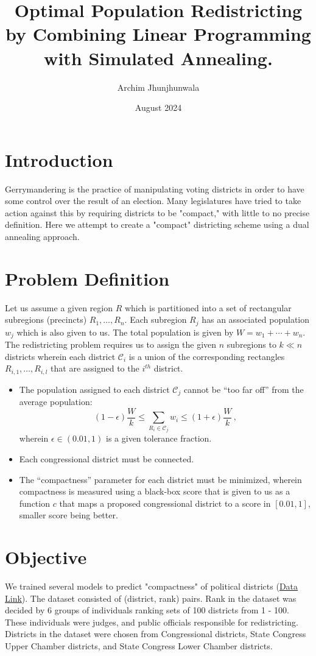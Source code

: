 \documentclass{article}
\title{Optimal Population Redistricting by Combining Linear Programming with Simulated Annealing.}
\author{Archim Jhunjhunwala}
\date{August 2024}
\begin{document}
\newcommand\scr[1]{\mathcal{#1}}

\maketitle

\section{Introduction}
Gerrymandering is the practice of manipulating voting districts in order to
have some control over the result of an election. Many legislatures have tried
to take action against this by requiring districts to be "compact," with little
to no precise definition. Here we attempt to create a "compact" districting
scheme using a dual annealing approach.

\section{Problem Definition}

Let us assume a given region $R$ which is partitioned into a set of rectangular
subregions (precincts) $R_1, \ldots, R_n$. Each subregion $R_j$ has an
associated population $w_j$ which is also given to us. The total population is
given by $W = w_1 + \cdots + w_n$. The redistricting problem requires us to
assign the given $n$ subregions to $k \ll n$ districts wherein each district
$\scr{C}_i$ is a union of the corresponding rectangles $R_{i,1}, \ldots,
	R_{i,l}$ that are assigned to the $i^{th}$ district.
\begin{itemize}
	\item The population assigned to each district $\scr{C}_j$ cannot be ``too far off''
	      from the average population:
	      \[  (1 - \epsilon) \frac{W}{k} \leq \sum_{R_i \in \scr{C}_j} w_i \leq (1 + \epsilon) \frac{W}{k}  \,,\]
	      wherein $\epsilon \in (0.01, 1)$ is a given tolerance fraction.
	\item Each congressional district must be connected.
	\item The ``compactness'' parameter for each district must be minimized, wherein
	      compactness is measured using a black-box score that is given to us as a
	      function $c$ that maps a proposed congressional district to a score in $[0.01,
				      1]$, smaller score being better.
\end{itemize}

\section{Objective}
We trained several models to predict "compactness" of political districts
(\href{https://github.com/aaronrkaufman/compactness}{Data Link}). The dataset
consisted of (district, rank) pairs. Rank in the dataset was decided by 6
groups of individuals ranking sets of 100 districts from 1 - 100. These
individuals were judges, and public officials responsible for redistricting.
Districts in the dataset were chosen from Congressional districts, State
Congress Upper Chamber districts, and State Congress Lower Chamber districts.
\end{document}
